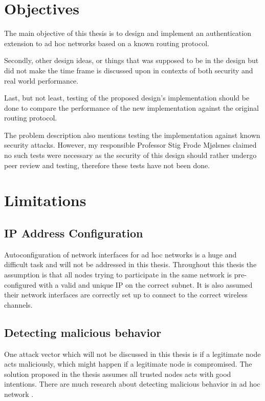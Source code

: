 \section{Objectives}
The main objective of this thesis is to design and implement an authentication
extension to ad hoc networks based on a known routing protocol.

Secondly, other design ideas, or things that was supposed to be in the design
but did not make the time frame is discussed upon in contexts of both security
and real world performance.

Last, but not least, testing of the proposed design's implementation should be
done to compare the performance of the new implementation against the original
routing protocol.

The problem description also mentions testing the implementation against known
security attacks. However, my responsible Professor Stig Frode Mj{\o}lsnes
claimed no such tests were necessary as the security of this design should
rather undergo peer review and testing, therefore these tests have not been
done.

\section{Limitations}

\subsection{IP Address Configuration}
\label{limit:ip_address_conf}
Autoconfiguration of network interfaces for ad hoc networks is a huge and
difficult task and will not be addressed in this thesis. Throughout this thesis
the assumption is that all nodes trying to participate in the same network is
pre-configured with a valid and unique IP on the correct subnet. It is also
assumed their network interfaces are correctly set up to connect to the correct
wireless channels.

\subsection{Detecting malicious behavior}
\label{limit:malicious_behaviour}
One attack vector which will not be discussed in this thesis is if a legitimate
node acts maliciously, which might happen if a legitimate node is compromised.
The solution proposed in the thesis assumes all trusted nodes acts with good
intentions. There are much research about detecting malicious behavior in ad
hoc network \cite{Pirzada_McDonald} \cite{dhurandher2010network}.

